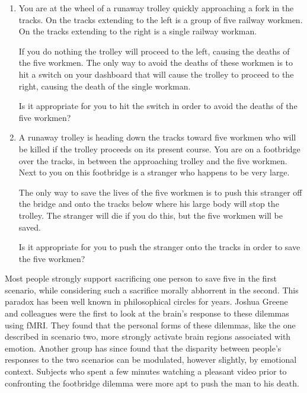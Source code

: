 \documentclass[a4paper,14pt]{extarticle}
\begin{document}
\begin{enumerate}
      \item
            You are at the wheel of a runaway trolley quickly approaching a fork in the tracks.
            On the tracks extending to the left is a group of five railway workmen.
            On the tracks extending to the right is a single railway workman.

            If you do nothing the trolley will proceed to the left, causing the deaths of the five workmen.
            The only way to avoid the deaths of these workmen is to hit a switch on your dashboard that will cause the trolley to proceed to the right, causing the death of the single workman.

            Is it appropriate for you to hit the switch in order to avoid the deaths of the five workmen?
      \item
            A runaway trolley is heading down the tracks toward five workmen who will be killed if the trolley proceeds on its present course.
            You are on a footbridge over the tracks, in between the approaching trolley and the five workmen.
            Next to you on this footbridge is a stranger who happens to be very large.

            The only way to save the lives of the five workmen is to push this stranger off the bridge and onto the tracks below where his large body will stop the trolley.
            The stranger will die if you do this, but the five workmen will be saved.

            Is it appropriate for you to push the stranger onto the tracks in order to save the five workmen?

\end{enumerate}

Most people strongly support sacrificing one person to save five in the first scenario, while considering such a sacrifice morally abhorrent in the second.
This paradox has been well known in philosophical circles for years.
Joshua Greene and colleagues were the first to look at the brain's response to these dilemmas using fMRI.
They found that the personal forms of these dilemmas, like the one described in scenario two, more strongly activate brain regions associated with emotion.
Another group has since found that the disparity between people's responses to the two scenarios can be modulated, however slightly, by emotional context.
Subjects who spent a few minutes watching a pleasant video prior to confronting the footbridge dilemma were more apt to push the man to his death.
\end{document}
